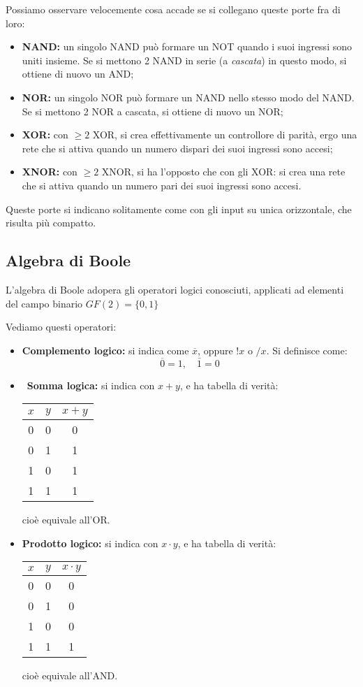 \documentclass[a4paper,11pt]{article}
\begin{document}
Possiamo osservare velocemente cosa accade se si collegano queste porte fra di loro:
\begin{itemize}
	\item \textbf{NAND:} un singolo NAND può formare un NOT quando i suoi ingressi sono uniti insieme.
		Se si mettono 2 NAND in serie (a \textit{cascata}) in questo modo, si ottiene di nuovo un AND;
	\item \textbf{NOR:} un singolo NOR può formare un NAND nello stesso modo del NAND.
		Se si mettono 2 NOR a cascata, si ottiene di nuovo un NOR;
	\item \textbf{XOR:} con $\geq 2$ XOR, si crea effettivamente un controllore di parità, ergo una rete che si attiva quando un numero dispari dei suoi ingressi sono accesi;
	\item \textbf{XNOR:} con $\geq 2$ XNOR, si ha l'opposto che con gli XOR: si crea una rete che si attiva quando un numero pari dei suoi ingressi sono accesi.
\end{itemize}

Queste porte si indicano solitamente come con gli input su unica orizzontale, che risulta più compatto.

\subsection{Algebra di Boole}
L'algebra di Boole adopera gli operatori logici conosciuti, applicati ad elementi del campo binario $GF(2) = \{0 , 1\}$

Vediamo questi operatori:
\begin{itemize}
	\item \textbf{Complemento logico:} si indica come $\overline{x}$, oppure $!x$ o $/x$. 
		Si definisce come: $$ \overline{0} = 1, \quad \bar{1} = 0 $$
	\item\ \textbf{Somma logica:} si indica con $x + y$, e ha tabella di verità:
	\begin{table}[H]
		\center
		\begin{tabular} { c  c | c }
			$x$ & $y$ & $ x + y $ \\ 
			\hline 
			0 & 0 & 0 \\ 
			0 & 1 & 1 \\ 
			1 & 0 & 1 \\ 
			1 & 1 & 1 \\
		\end{tabular}
	\end{table}
		cioè equivale all'OR.
	\item \textbf{Prodotto logico:} si indica con $x \cdot y$, e ha tabella di verità:
	\begin{table}[H]
		\center
		\begin{tabular} { c  c | c }
			$x$ & $y$ & $ x \cdot y $ \\ 
			\hline 
			0 & 0 & 0 \\ 
			0 & 1 & 0 \\ 
			1 & 0 & 0 \\ 
			1 & 1 & 1 \\
		\end{tabular}
	\end{table}
		cioè equivale all'AND.

\end{itemize}
\end{document}

